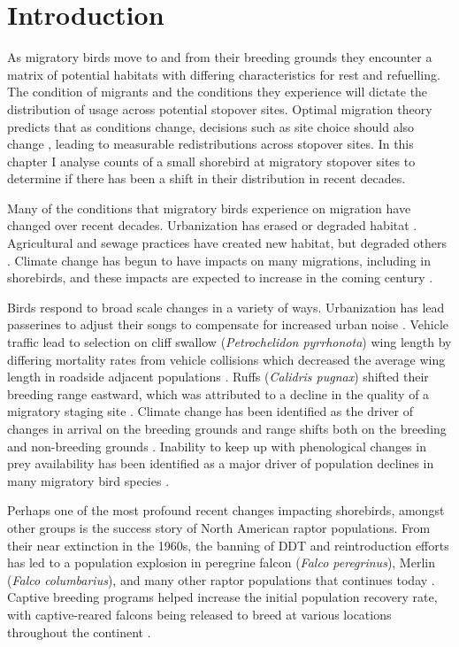 \section{Introduction}

As migratory birds move to and from their breeding grounds they encounter a matrix of potential habitats with differing characteristics for rest and refuelling. The condition of migrants and the conditions they experience will dictate the distribution of usage across potential stopover sites. Optimal migration theory predicts that as conditions change, decisions such as site choice should also change \citep{Alerstam1990}, leading to measurable redistributions across stopover sites. In this chapter I analyse counts of a small shorebird at migratory stopover sites to determine if there has been a shift in their distribution in recent decades. 

Many of the conditions that migratory birds experience on migration have changed over recent decades. Urbanization has erased or degraded habitat \citep{Iwamura2013,Studds2017}. Agricultural and sewage practices have created new habitat, but degraded others \citep{Taft2006a,Alves2012}. Climate change has begun to have impacts on many migrations, including in shorebirds, and these impacts are expected to increase in the coming century \citep{Both2007,Gordo2007,cox2010bird,Sutherland2015}. 

Birds respond to broad scale changes in a variety of ways. Urbanization has lead passerines to adjust their songs to compensate for increased urban noise \citep{Patricelli2006,Wood2006}. Vehicle traffic lead to selection on cliff swallow (\textit{Petrochelidon pyrrhonota}) wing length by differing mortality rates from vehicle collisions which decreased the average wing length in roadside adjacent populations \citep{Brown2013}. Ruffs (\textit{Calidris pugnax}) shifted their breeding range eastward, which was attributed to a decline in the quality of a migratory staging site \citep{rakhimberdiev_global_2011}. Climate change has been identified as the driver of changes in arrival on the breeding grounds and range shifts both on the breeding and non-breeding grounds \citep{Gordo2007,Jonzen2006,cox2010bird,Hu2010,Gill20132161}. Inability to keep up with phenological changes in prey availability has been identified as a major driver of population declines in many migratory bird species \citep{Both2006,Jones2010,Fraser2013a}.

Perhaps one of the most profound recent changes impacting shorebirds, amongst other groups is the success story of North American raptor populations. From their near extinction in the 1960s, the banning of DDT and reintroduction efforts has led to a population explosion in peregrine falcon (\textit{Falco peregrinus}), Merlin (\textit{Falco columbarius}), and many other raptor populations that continues today \citep{Cade1988,Cava2014,Ydenberg2017}. Captive breeding programs helped increase the initial population recovery rate, with captive-reared falcons being released to breed at various locations throughout the continent \citep{amirault20041995,Gahbauer2015,Watts2015}. 

